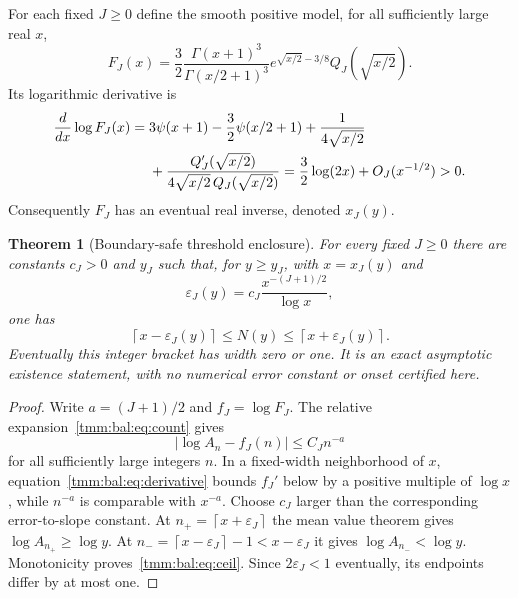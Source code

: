 \documentclass[11pt,letterpaper]{article}
\newtheorem{theorem}{Theorem}[section]
\theoremstyle{remark}\newtheorem{remark}[theorem]{Remark}
\newcommand{\ceil}[1]{\left\lceil #1\right\rceil}
\begin{document}
For each fixed $J\ge0$ define the smooth positive model, for all sufficiently large real $x$,
\begin{equation}\label{tmm:bal:eq:FJ}
 F_J(x)=\frac32\frac{\Gamma(x+1)^3}{\Gamma(x/2+1)^3}
 e^{\sqrt{x/2}-3/8}Q_J(\sqrt{x/2}).
\end{equation}
Its logarithmic derivative is
\begin{align}
 \frac{d}{dx}\log F_J(x)
 ={}&3\psi(x+1)-\frac32\psi(x/2+1)+\frac1{4\sqrt{x/2}}\notag\\
 &+\frac{Q_J'(\sqrt{x/2})}{4\sqrt{x/2}\,Q_J(\sqrt{x/2})}
 =\frac32\log(2x)+O_J(x^{-1/2})>0.\label{tmm:bal:eq:derivative}
\end{align}
Consequently $F_J$ has an eventual real inverse, denoted $x_J(y)$.

\begin{theorem}[Boundary-safe threshold enclosure]\label{tmm:bal:thm:enclosure}
For every fixed $J\ge0$ there are constants $c_J>0$ and $y_J$ such that, for $y\ge y_J$, with $x=x_J(y)$ and
\begin{equation}\label{tmm:bal:eq:epsilon}
 \varepsilon_J(y)=c_J\frac{x^{-(J+1)/2}}{\log x},
\end{equation}
one has
\begin{equation}\label{tmm:bal:eq:ceil}
 \ceil{x-\varepsilon_J(y)}\le N(y)\le\ceil{x+\varepsilon_J(y)}.
\end{equation}
Eventually this integer bracket has width zero or one. It is an exact asymptotic existence statement, with no numerical error constant or onset certified here.
\end{theorem}
\begin{proof}
Write $a=(J+1)/2$ and $f_J=\log F_J$. The relative expansion~\eqref{tmm:bal:eq:count} gives
\[
 |\log A_n-f_J(n)|\le C_Jn^{-a}
\]
for all sufficiently large integers $n$. In a fixed-width neighborhood of $x$, equation~\eqref{tmm:bal:eq:derivative} bounds $f_J'$ below by a positive multiple of $\log x$, while $n^{-a}$ is comparable with $x^{-a}$. Choose $c_J$ larger than the corresponding error-to-slope constant. At $n_+=\ceil{x+\varepsilon_J}$ the mean value theorem gives $\log A_{n_+}\ge\log y$. At $n_- =\ceil{x-\varepsilon_J}-1<x-\varepsilon_J$ it gives $\log A_{n_-}<\log y$. Monotonicity proves~\eqref{tmm:bal:eq:ceil}. Since $2\varepsilon_J<1$ eventually, its endpoints differ by at most one.
\end{proof}
\end{document}
